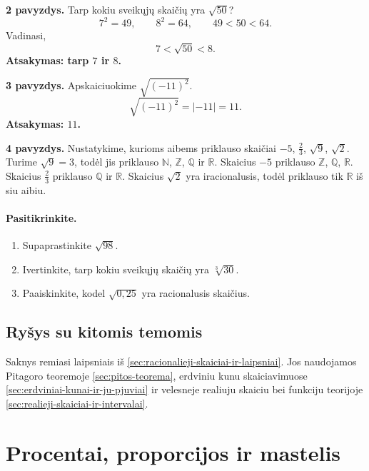 \textbf{2 pavyzdys.} Tarp kokiu sveikųjų skaičių yra $\sqrt{50}$?
\[
7^2=49,\qquad 8^2=64,\qquad 49<50<64.
\]
Vadinasi,
\[
7<\sqrt{50}<8.
\]
\textbf{Atsakymas: tarp $7$ ir $8$.}

\textbf{3 pavyzdys.} Apskaiciuokime $\sqrt{(-11)^2}$.
\[
\sqrt{(-11)^2}=|-11|=11.
\]
\textbf{Atsakymas: $11$.}

\textbf{4 pavyzdys.} Nustatykime, kurioms aibems priklauso skaičiai $-5$, $\frac23$, $\sqrt9$, $\sqrt2$.
Turime $\sqrt9=3$, todėl jis priklauso $\mathbb{N}$, $\mathbb{Z}$, $\mathbb{Q}$ ir $\mathbb{R}$. Skaicius $-5$ priklauso $\mathbb{Z}$, $\mathbb{Q}$, $\mathbb{R}$. Skaicius $\frac23$ priklauso $\mathbb{Q}$ ir $\mathbb{R}$. Skaicius $\sqrt2$ yra iracionalusis, todėl priklauso tik $\mathbb{R}$ iš siu aibiu.

\paragraph{Pasitikrinkite.}
\begin{enumerate}[label=\alph*)]
\item Supaprastinkite $\sqrt{98}$.
\item Ivertinkite, tarp kokiu sveikųjų skaičių yra $\sqrt[3]{30}$.
\item Paaiskinkite, kodel $\sqrt{0{,}25}$ yra racionalusis skaičius.
\end{enumerate}

\subsection{Ryšys su kitomis temomis}
Saknys remiasi laipsniais iš \ref{sec:racionalieji-skaiciai-ir-laipsniai}. Jos naudojamos Pitagoro teoremoje \ref{sec:pitos-teorema}, erdviniu kunu skaiciavimuose \ref{sec:erdviniai-kunai-ir-ju-pjuviai} ir velesneje realiuju skaiciu bei funkciju teorijoje \ref{sec:realieji-skaiciai-ir-intervalai}.

\section{Procentai, proporcijos ir mastelis}\label{sec:procentai-proporcijos-ir-mastelis}

